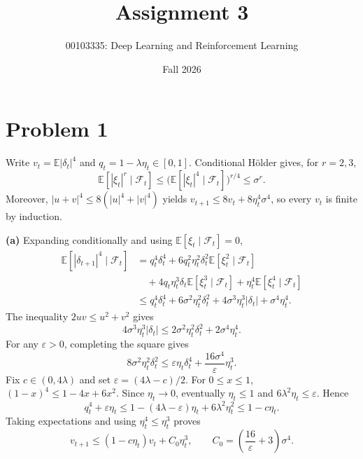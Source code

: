 \documentclass[11pt]{article}
\title{Assignment 3}
\author{00103335: Deep Learning and Reinforcement Learning}
\date{Fall 2026}
\newcommand{\E}{\mathbb E}
\begin{document}
\maketitle

\section*{Problem 1}
Write $v_t=\E|\delta_t|^4$ and $q_t=1-\lambda\eta_t\in[0,1]$.
Conditional H\"older gives, for $r=2,3$,
\[
 \E[|\xi_t|^r\mid\mathcal F_t]
 \leq\big(\E[|\xi_t|^4\mid\mathcal F_t]\big)^{r/4}\leq\sigma^r.
\]
Moreover, $|u+v|^4\leq8(|u|^4+|v|^4)$ yields
$v_{t+1}\leq8v_t+8\eta_t^4\sigma^4$, so every $v_t$ is finite by induction.

\textbf{(a)} Expanding conditionally and using $\E[\xi_t\mid\mathcal F_t]=0$,
\begin{align*}
 \E[|\delta_{t+1}|^4\mid\mathcal F_t]
 &=q_t^4\delta_t^4
 +6q_t^2\eta_t^2\delta_t^2\E[\xi_t^2\mid\mathcal F_t]\\
 &\quad+4q_t\eta_t^3\delta_t\E[\xi_t^3\mid\mathcal F_t]
 +\eta_t^4\E[\xi_t^4\mid\mathcal F_t]\\
 &\leq q_t^4\delta_t^4+6\sigma^2\eta_t^2\delta_t^2
 +4\sigma^3\eta_t^3|\delta_t|+\sigma^4\eta_t^4.
\end{align*}
The inequality $2uv\leq u^2+v^2$ gives
\[
 4\sigma^3\eta_t^3|\delta_t|
 \leq2\sigma^2\eta_t^2\delta_t^2+2\sigma^4\eta_t^4.
\]
For any $\varepsilon>0$, completing the square gives
\[
 8\sigma^2\eta_t^2\delta_t^2
 \leq\varepsilon\eta_t\delta_t^4
       +\frac{16\sigma^4}{\varepsilon}\eta_t^3.
\]
Fix $c\in(0,4\lambda)$ and set $\varepsilon=(4\lambda-c)/2$.
For $0\leq x\leq1$, $(1-x)^4\leq1-4x+6x^2$.
Since $\eta_t\to0$, eventually $\eta_t\leq1$ and
$6\lambda^2\eta_t\leq\varepsilon$. Hence
\[
 q_t^4+\varepsilon\eta_t
 \leq1-(4\lambda-\varepsilon)\eta_t+6\lambda^2\eta_t^2
 \leq1-c\eta_t.
\]
Taking expectations and using $\eta_t^4\leq\eta_t^3$ proves
\[
 \boxed{v_{t+1}\leq(1-c\eta_t)v_t+C_0\eta_t^3},
 \qquad C_0=\left(\frac{16}{\varepsilon}+3\right)\sigma^4.
\]
\end{document}
